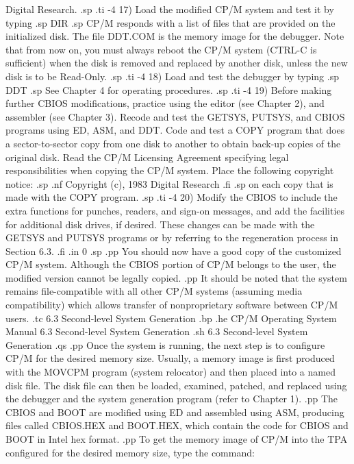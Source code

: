 Digital Research.
.sp
.ti -4
17) Load the modified CP/M system and test it by typing
.sp
DIR
.sp
CP/M responds with a list of files that are provided on the 
initialized disk.  The file DDT.COM is the memory image for the 
debugger.  Note that from now on, you must always reboot the 
CP/M system (CTRL-C is sufficient) when the disk is removed and 
replaced by another disk, unless the new disk is to be Read-Only.
.sp
.ti -4
18) Load and test the debugger by typing
.sp
DDT
.sp
See Chapter 4 for operating procedures.
.sp
.ti -4
19) Before making further CBIOS modifications, practice using the 
editor (see Chapter 2), and assembler (see Chapter 3).  Recode 
and test the GETSYS, PUTSYS, and CBIOS programs using ED, ASM, 
and DDT.  Code and test a COPY program that does a sector-to-sector
copy from one disk to another to obtain back-up copies of 
the original disk.  Read the CP/M Licensing Agreement specifying 
legal responsibilities when copying the CP/M system.  Place the 
following copyright notice:
.sp
.nf
Copyright (c), 1983
 Digital Research
.fi
.sp
on each copy that is made with the COPY program.
.sp
.ti -4
20) Modify the CBIOS to include the extra functions for punches, 
readers, and sign-on messages, and add the facilities for 
additional disk drives, if desired.  These changes can be made 
with the GETSYS and PUTSYS programs or by referring to the 
regeneration process in Section 6.3.
.fi
.in 0
.sp
.pp
You should now have a good copy of the customized CP/M 
system.  Although the CBIOS portion of CP/M belongs to the user, 
the modified version cannot be legally copied.
.pp
It should be noted that the system remains file-compatible with 
all other CP/M systems (assuming media compatibility) which 
allows transfer of nonproprietary software between CP/M users.
.tc    6.3  Second-level System Generation
.bp
.he CP/M Operating System Manual  6.3  Second-level System Generation
.sh
6.3  Second-level System Generation
.qs
.pp
Once the system is running, the next step is to configure CP/M 
for the desired memory size.  Usually, a memory image is first 
produced with the MOVCPM program (system relocator) and then 
placed into a named disk file.  The disk file can then be loaded, 
examined, patched, and replaced using the debugger and the 
system generation program (refer to Chapter 1).
.pp
The CBIOS and BOOT are modified using ED and assembled using ASM, 
producing files called CBIOS.HEX and BOOT.HEX, which contain the 
code for CBIOS and BOOT in Intel hex format.
.pp
To get the memory image of CP/M into the TPA configured for the 
desired memory size, type the command:
